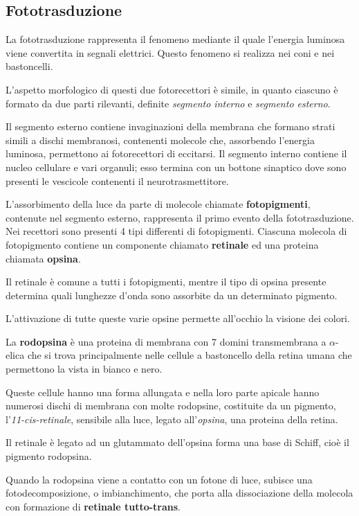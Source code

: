 \documentclass[]{article}
\begin{document}
\subsection{Fototrasduzione}\label{fototrasduzione}

La fototrasduzione rappresenta il fenomeno mediante il quale l'energia
luminosa viene convertita in segnali elettrici. Questo fenomeno si
realizza nei coni e nei bastoncelli.

L'aspetto morfologico di questi due fotorecettori è simile, in quanto
ciascuno è formato da due parti rilevanti, definite \emph{segmento
interno} e \emph{segmento esterno}.

Il segmento esterno contiene invaginazioni della membrana che formano
strati simili a dischi membranosi, contenenti molecole che, assorbendo
l'energia luminosa, permettono ai fotorecettori di eccitarsi. Il
segmento interno contiene il nucleo cellulare e vari organuli; esso
termina con un bottone sinaptico dove sono presenti le vescicole
contenenti il neurotrasmettitore.

L'assorbimento della luce da parte di molecole chiamate
\textbf{fotopigmenti}, contenute nel segmento esterno, rappresenta il
primo evento della fototrasduzione. Nei recettori sono presenti 4 tipi
differenti di fotopigmenti. Ciascuna molecola di fotopigmento contiene
un componente chiamato \textbf{retinale} ed una proteina chiamata
\textbf{opsina}.

Il retinale è comune a tutti i fotopigmenti, mentre il tipo di opsina
presente determina quali lunghezze d'onda sono assorbite da un
determinato pigmento.

L'attivazione di tutte queste varie opsine permette all'occhio la
visione dei colori.

La \textbf{rodopsina} è una proteina di membrana con 7 domini
transmembrana a \(\alpha\)-elica che si trova principalmente nelle
cellule a bastoncello della retina umana che permettono la vista in
bianco e nero.

Queste cellule hanno una forma allungata e nella loro parte apicale
hanno numerosi dischi di membrana con molte rodopsine, costituite da un
pigmento, l'\emph{11-cis-retinale}, sensibile alla luce, legato
all'\emph{opsina}, una proteina della retina.

Il retinale è legato ad un glutammato dell'opsina forma una base di
Schiff, cioè il pigmento rodopsina.

Quando la rodopsina viene a contatto con un fotone di luce, subisce una
fotodecomposizione, o imbianchimento, che porta alla dissociazione della
molecola con formazione di \textbf{retinale tutto-trans}.
\end{document}
